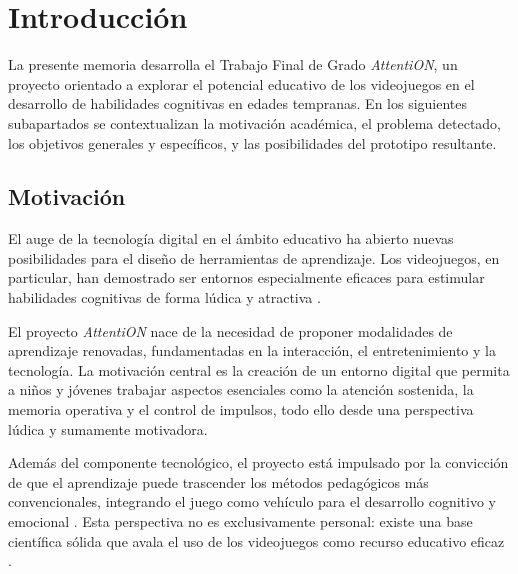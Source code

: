 \documentclass[12pt, a4paper]{report}
\begin{document}

\tableofcontents

\clearpage
{}

\chapter{Introducción}

La presente memoria desarrolla el Trabajo Final de Grado \textit{AttentiON},
un proyecto orientado a explorar el potencial educativo de los videojuegos
en el desarrollo de habilidades cognitivas en edades tempranas. En los
siguientes subapartados se contextualizan la motivación académica, el
problema detectado, los objetivos generales y específicos, y las posibilidades
del prototipo resultante.

\section{Motivación}

El auge de la tecnología digital en el ámbito educativo ha abierto nuevas
posibilidades para el diseño de herramientas de aprendizaje. Los videojuegos,
en particular, han demostrado ser entornos especialmente eficaces para estimular
habilidades cognitivas de forma lúdica y atractiva \citep{Gee2003,Connolly2012}.

El proyecto \textit{AttentiON} nace de la necesidad de proponer modalidades de
aprendizaje renovadas, fundamentadas en la interacción, el entretenimiento y la
tecnología. La motivación central es la creación de un entorno digital que permita
a niños y jóvenes trabajar aspectos esenciales como la atención sostenida, la
memoria operativa y el control de impulsos, todo ello desde una perspectiva lúdica
y sumamente motivadora.

Además del componente tecnológico, el proyecto está impulsado por la convicción de
que el aprendizaje puede trascender los métodos pedagógicos más convencionales,
integrando el juego como vehículo para el desarrollo cognitivo y emocional
\citep{Granic2014}. Esta perspectiva no es exclusivamente personal: existe una
base científica sólida que avala el uso de los videojuegos como recurso educativo
eficaz \citep{Bediou2018,Powers2013}.
\end{document}
